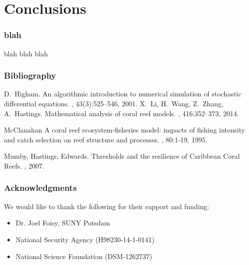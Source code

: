 
\section{Conclusions}


\begin{frame}
  \frametitle{blah}

  blah blah blah

\end{frame}

 
\begin{frame}
  \frametitle{Bibliography}

 \begin{thebibliography}{1}

   D.~Higham.
   \newblock An algorithmic introduction to numerical simulation of stochastic
   differential equations.
   , 43(3):525--546, 2001.
   X.~Li, H.~Wang, Z.~Zhang, A.~Hastings.
   \newblock Mathematical analysis of coral reef models.
   , 416:352--373, 2014.

    McClanahan
    \newblock A coral reef ecosystem-fisheries model: impacts of fishing intensity and catch selection on reef structure and processes.
    , 80:1-19, 1995.

    Mumby, Hastings, Edwards.
    \newblock Thresholds and the resilience of Caribbean Coral Reefs.
    , 2007.
  \end{thebibliography}
  
\end{frame}

\begin{frame}
  \frametitle{Acknowledgments}
  
  We would like to thank the following for their support and funding: 
  
 \begin{itemize}
 \item Dr. Joel Foisy, SUNY Potsdam
 \item National Security Agency (H98230-14-1-0141)
 \item National Science Foundation (DSM-1262737)
 \end{itemize}
\end{frame}


